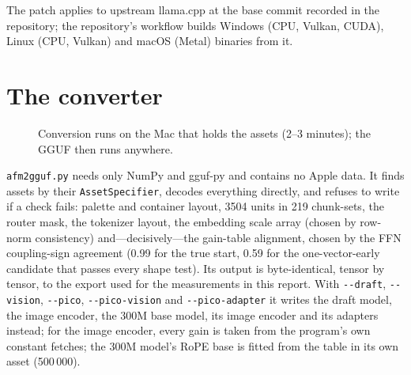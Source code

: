 \documentclass[11pt,reqno]{amsart}
\newcommand{\code}[1]{\texttt{#1}}
\theoremstyle{definition}
\begin{document}
\noindent The patch applies to upstream llama.cpp at the base commit recorded in the repository; the repository's workflow builds Windows (CPU, Vulkan, CUDA), Linux (CPU, Vulkan) and macOS (Metal) binaries from it.

\section{The converter}\label{sec:converter}

\begin{figure}[!htbp]
\centering
{}
\caption{Conversion runs on the Mac that holds the assets (2--3 minutes); the GGUF then runs anywhere.}
\end{figure}

\code{afm2gguf.py} needs only NumPy and gguf-py and contains no Apple data. It finds assets by their \code{AssetSpecifier}, decodes everything directly, and refuses to write if a check fails: palette and container layout, 3504 units in 219 chunk-sets, the router mask, the tokenizer layout, the embedding scale array (chosen by row-norm consistency) and---decisively---the gain-table alignment, chosen by the FFN coupling-sign agreement (0.99 for the true start, 0.59 for the one-vector-early candidate that passes every shape test). Its output is byte-identical, tensor by tensor, to the export used for the measurements in this report. With \code{-{}-draft}, \code{-{}-vision}, \code{-{}-pico}, \code{-{}-pico-vision} and \code{-{}-pico-adapter} it writes the draft model, the image encoder, the 300M base model, its image encoder and its adapters instead; for the image encoder, every gain is taken from the program's own constant fetches; the 300M model's RoPE base is fitted from the table in its own asset (500\,000).
\end{document}
